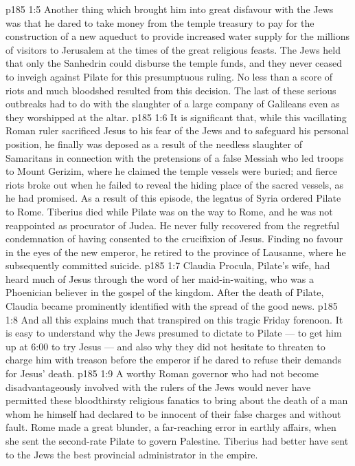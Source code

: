 \vs p185 1:5 \pc Another thing which brought him into great disfavour with the Jews was that he dared to take money from the temple treasury to pay for the construction of a new aqueduct to provide increased water supply for the millions of visitors to Jerusalem at the times of the great religious feasts. The Jews held that only the Sanhedrin could disburse the temple funds, and they never ceased to inveigh against Pilate for this presumptuous ruling. No less than a score of riots and much bloodshed resulted from this decision. The last of these serious outbreaks had to do with the slaughter of a large company of Galileans even as they worshipped at the altar.
\vs p185 1:6 \pc It is significant that, while this vacillating Roman ruler sacrificed Jesus to his fear of the Jews and to safeguard his personal position, he finally was deposed as a result of the needless slaughter of Samaritans in connection with the pretensions of a false Messiah who led troops to Mount Gerizim, where he claimed the temple vessels were buried; and fierce riots broke out when he failed to reveal the hiding place of the sacred vessels, as he had promised. As a result of this episode, the legatus of Syria ordered Pilate to Rome. Tiberius died while Pilate was on the way to Rome, and he was not reappointed as procurator of Judea. He never fully recovered from the regretful condemnation of having consented to the crucifixion of Jesus. Finding no favour in the eyes of the new emperor, he retired to the province of Lausanne, where he subsequently committed suicide.
\vs p185 1:7 \pc Claudia Procula, Pilate’s wife, had heard much of Jesus through the word of her maid\hyp{}in\hyp{}waiting, who was a Phoenician believer in the gospel of the kingdom. After the death of Pilate, Claudia became prominently identified with the spread of the good news.
\vs p185 1:8 \pc And all this explains much that transpired on this tragic Friday forenoon. It is easy to understand why the Jews presumed to dictate to Pilate --- to get him up at 6:00 to try Jesus --- and also why they did not hesitate to threaten to charge him with treason before the emperor if he dared to refuse their demands for Jesus’ death.
\vs p185 1:9 A worthy Roman governor who had not become disadvantageously involved with the rulers of the Jews would never have permitted these bloodthirsty religious fanatics to bring about the death of a man whom he himself had declared to be innocent of their false charges and without fault. Rome made a great blunder, a far\hyp{}reaching error in earthly affairs, when she sent the second\hyp{}rate Pilate to govern Palestine. Tiberius had better have sent to the Jews the best provincial administrator in the empire.
